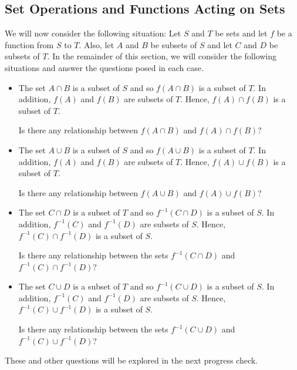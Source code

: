 \subsection*{Set Operations and Functions Acting on Sets}
We will now consider the following situation:  Let $S$ and $T$ be sets and let $f$ be a function from $S$ to $T$.  Also, let $A$ and $B$ be subsets of $S$ and let $C$ and $D$ be subsets of $T$.  In the remainder of this section, we will consider the following situations and answer the questions posed in each case.

\begin{itemize}
\item The set $A \cap B$ is a subset of $S$ and so $f ( A \cap B )$ is a subset of $T$.  In addition, $f ( A )$ and $f ( B )$ are subsets of $T$.  Hence, 
$f ( A ) \cap f ( B )$ is a subset of $T$.

\noindent
Is there any relationship between $f ( A \cap B )$ and 
$f ( A ) \cap f ( B )$?


\item The set $A \cup B$ is a subset of $S$ and so $f ( A \cup B )$ is a subset of $T$.  In addition, $f ( A )$ and $f ( B )$ are subsets of $T$.  Hence, 
$f ( A ) \cup f ( B )$ is a subset of $T$.

\noindent
Is there any relationship between $f ( A \cup B )$ and 
$f ( A ) \cup f ( B )$?

\item The set $C \cap D$ is a subset of $T$ and so $f^{-1} ( C \cap D )$ is a subset of $S$.  In addition, $f^{-1} ( C )$ and $f^{-1} ( D )$ are subsets of $S$. Hence, $f^{-1} ( C ) \cap f^{-1} ( D )$ is a subset of $S$.

\noindent
Is there any relationship between the sets $f^{-1} ( C \cap D )$ and \linebreak 
$f^{-1} ( C ) \cap f^{-1} ( D )$?

\item The set $C \cup D$ is a subset of $T$ and so $f^{-1} ( C \cup D )$ is a subset of $S$.  In addition, $f^{-1} ( C )$ and $f^{-1} ( D )$ are subsets of $S$. Hence, $f^{-1} ( C ) \cup f^{-1} ( D )$ is a subset of $S$.

\noindent
Is there any relationship between the sets $f^{-1} ( C \cup D )$ and \linebreak
$f^{-1} ( C ) \cup f^{-1} ( D )$?
\end{itemize}

\noindent
These and other questions will be explored in the next progress check.
\hbreak

